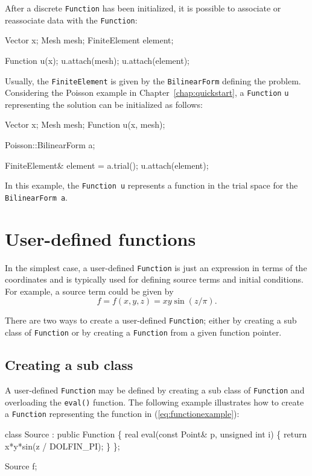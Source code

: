 After a discrete \texttt{Function} has been initialized, it is
possible to associate or reassociate data with the \texttt{Function}:
\begin{code}
  Vector x;
  Mesh mesh;
  FiniteElement element;

  Function u(x);
  u.attach(mesh);
  u.attach(element);
\end{code}

Usually, the \texttt{FiniteElement} is given by the
\texttt{BilinearForm} defining the problem. Considering the Poisson
example in Chapter~\ref{chap:quickstart}, a \texttt{Function}
\texttt{u} representing the solution can be initialized as follows:
\begin{code}
  Vector x;
  Mesh mesh;
  Function u(x, mesh);

  Poisson::BilinearForm a;

  FiniteElement& element = a.trial();
  u.attach(element); 
\end{code}
In this example, the \texttt{Function}~\texttt{u} represents a
function in the trial space for the \texttt{BilinearForm}~\texttt{a}.

\section{User-defined functions}

In the simplest case, a user-defined \texttt{Function} is just an
expression in terms of the coordinates and is typically used for
defining source terms and initial conditions. For example, a source
term could be given by
\begin{equation} \label{eq:functionexample}
  f = f(x, y, z) = xy \sin(z / \pi).
\end{equation}

There are two ways to create a user-defined \texttt{Function}; either
by creating a sub class of \texttt{Function} or by creating a
\texttt{Function} from a given function pointer.

\subsection{Creating a sub class}

A user-defined \texttt{Function} may be defined by creating a sub
class of \texttt{Function} and overloading the \texttt{eval()}
function.  The following example illustrates how to create a
\texttt{Function} representing the function in
(\ref{eq:functionexample}):
\begin{code}
  class Source : public Function
  \{
    real eval(const Point& p, unsigned int i)
    \{
      return x*y*sin(z / DOLFIN_PI);
    \}
  \};

  Source f;
\end{code}


